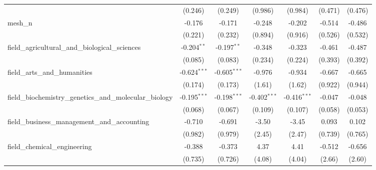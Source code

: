 \begin{tabular}{lcccccc}
                                                               & (0.246)        & (0.249)        & (0.986)        & (0.984)        & (0.471)        & (0.476)\\   
   mesh\_n                                                     & -0.176         & -0.171         & -0.248         & -0.202         & -0.514         & -0.486\\   
                                                               & (0.221)        & (0.232)        & (0.894)        & (0.916)        & (0.526)        & (0.532)\\   
   field\_agricultural\_and\_biological\_sciences              & -0.204$^{**}$  & -0.197$^{**}$  & -0.348         & -0.323         & -0.461         & -0.487\\   
                                                               & (0.085)        & (0.083)        & (0.234)        & (0.224)        & (0.393)        & (0.392)\\   
   field\_arts\_and\_humanities                                & -0.624$^{***}$ & -0.605$^{***}$ & -0.976         & -0.934         & -0.667         & -0.665\\   
                                                               & (0.174)        & (0.173)        & (1.61)         & (1.62)         & (0.922)        & (0.944)\\   
   field\_biochemistry\_genetics\_and\_molecular\_biology      & -0.195$^{***}$ & -0.198$^{***}$ & -0.402$^{***}$ & -0.416$^{***}$ & -0.047         & -0.048\\   
                                                               & (0.068)        & (0.067)        & (0.109)        & (0.107)        & (0.058)        & (0.053)\\   
   field\_business\_management\_and\_accounting                & -0.710         & -0.691         & -3.50          & -3.45          & 0.093          & 0.102\\   
                                                               & (0.982)        & (0.979)        & (2.45)         & (2.47)         & (0.739)        & (0.765)\\   
   field\_chemical\_engineering                                & -0.388         & -0.373         & 4.37           & 4.41           & -0.512         & -0.656\\   
                                                               & (0.735)        & (0.726)        & (4.08)         & (4.04)         & (2.66)         & (2.60)\\   

\end{tabular}
